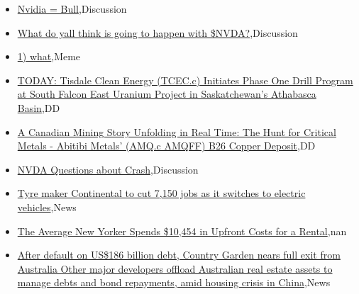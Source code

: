 \documentclass{article}%
\begin{document}
%
\begin{itemize}%
\item%
\href{https://reddit.com/r/wallstreetbets/comments/1awa666/nvidia\_bull/}{Nvidia = Bull},Discussion%
\item%
\href{https://reddit.com/r/wallstreetbets/comments/1aw9ws8/what\_do\_yall\_think\_is\_going\_to\_happen\_with\_nvda/}{What do yall think is going to happen with \$NVDA?},Discussion%
\item%
\href{https://reddit.com/r/wallstreetbets/comments/1aw7y8y/1\_what/}{1) what},Meme%
\item%
\href{https://reddit.com/r/Baystreetbets/comments/1avy6wz/today\_tisdale\_clean\_energy\_tcecc\_initiates\_phase/}{TODAY: Tisdale Clean Energy (TCEC.c) Initiates Phase One Drill Program at South Falcon East Uranium Project in Saskatchewan's Athabasca Basin},DD%
\item%
\href{https://reddit.com/r/Baystreetbets/comments/1avv6f6/a\_canadian\_mining\_story\_unfolding\_in\_real\_time/}{A Canadian Mining Story Unfolding in Real Time: The Hunt for Critical Metals - Abitibi Metals' (AMQ.c AMQFF) B26 Copper Deposit},DD%
\item%
\href{https://reddit.com/r/StockMarket/comments/1avoez8/nvda\_questions\_about\_crash/}{NVDA Questions about Crash},Discussion%
\item%
\href{https://reddit.com/r/Economics/comments/1aw5wg6/tyre\_maker\_continental\_to\_cut\_7150\_jobs\_as\_it/}{Tyre maker Continental to cut 7,150 jobs as it switches to electric vehicles},News%
\item%
\href{https://reddit.com/r/Economics/comments/1avwtez/the\_average\_new\_yorker\_spends\_10454\_in\_upfront/}{The Average New Yorker Spends \$10,454 in Upfront Costs for a Rental},nan%
\item%
\href{https://reddit.com/r/Economics/comments/1avw5tj/after\_default\_on\_us186\_billion\_debt\_country/}{After default on US\$186 billion debt, Country Garden nears full exit from Australia  Other major developers offload Australian real estate assets to manage debts and bond repayments, amid housing crisis in China},News%
\end{itemize}%
\end{document}
